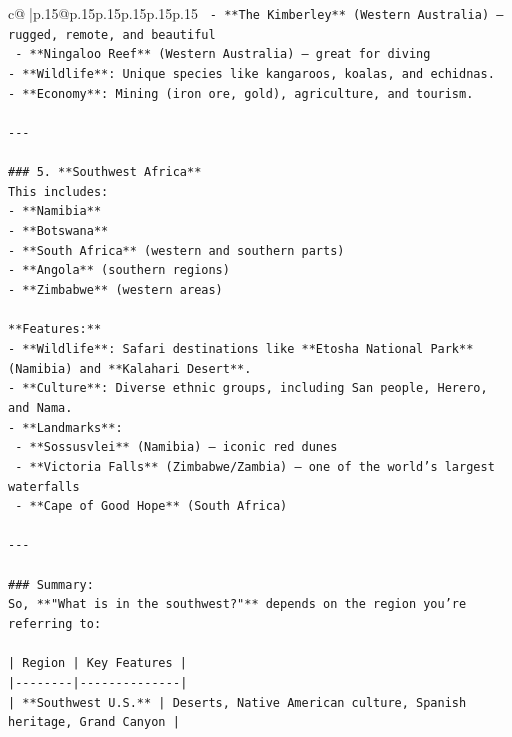 \documentclass{article}
\begin{document}
{\begin{supertabular}{c@{$\;$}|p{.15\linewidth}@{}p{.15\linewidth}p{.15\linewidth}p{.15\linewidth}p{.15\linewidth}p{.15\linewidth}}
{{{\texttt{  {-} **The Kimberley** (Western Australia) – rugged, remote, and beautiful} \\
\texttt{  {-} **Ningaloo Reef** (Western Australia) – great for diving} \\
\texttt{{-} **Wildlife**: Unique species like kangaroos, koalas, and echidnas.} \\
\texttt{{-} **Economy**: Mining (iron ore, gold), agriculture, and tourism.} \\
\\ 
\texttt{{-}{-}{-}} \\
\\ 
\texttt{\#\#\# 5. **Southwest Africa**} \\
\texttt{This includes:} \\
\texttt{{-} **Namibia**} \\
\texttt{{-} **Botswana**} \\
\texttt{{-} **South Africa** (western and southern parts)} \\
\texttt{{-} **Angola** (southern regions)} \\
\texttt{{-} **Zimbabwe** (western areas)} \\
\\ 
\texttt{**Features:**} \\
\texttt{{-} **Wildlife**: Safari destinations like **Etosha National Park** (Namibia) and **Kalahari Desert**.} \\
\texttt{{-} **Culture**: Diverse ethnic groups, including San people, Herero, and Nama.} \\
\texttt{{-} **Landmarks**:} \\
\texttt{  {-} **Sossusvlei** (Namibia) – iconic red dunes} \\
\texttt{  {-} **Victoria Falls** (Zimbabwe/Zambia) – one of the world’s largest waterfalls} \\
\texttt{  {-} **Cape of Good Hope** (South Africa)} \\
\\ 
\texttt{{-}{-}{-}} \\
\\ 
\texttt{\#\#\# Summary:} \\
\texttt{So, **"What is in the southwest?"** depends on the region you're referring to:} \\
\\ 
\texttt{| Region | Key Features |} \\
\texttt{|{-}{-}{-}{-}{-}{-}{-}{-}|{-}{-}{-}{-}{-}{-}{-}{-}{-}{-}{-}{-}{-}{-}|} \\
\texttt{| **Southwest U.S.** | Deserts, Native American culture, Spanish heritage, Grand Canyon |} \\
}}}
\end{supertabular}}
\end{document}
